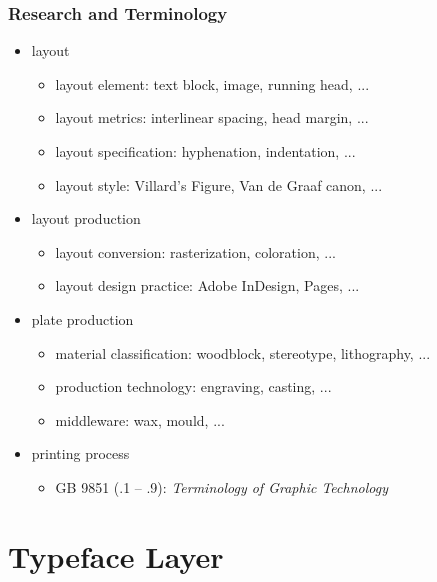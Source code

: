 \documentclass{beamer}
\begin{document}
	\begin{frame}
		\frametitle{Research and Terminology}

		\begin{itemize}
			\item layout
			\begin{itemize}
                \item layout element: text block, image, running head, ...
				\item layout metrics: interlinear spacing, head margin, ...
				\item layout specification: hyphenation, indentation, ...
				\item layout style: Villard's Figure, Van de Graaf canon, ...
            \end{itemize}
			\item layout production
			\begin{itemize}
				\item layout conversion: rasterization, coloration, ...
				\item layout design practice: Adobe InDesign, Pages, ...
			\end{itemize}
            \item plate production
			\begin{itemize}
                \item material classification: woodblock, stereotype, lithography, ...
                \item production technology: engraving, casting, ...
                \item middleware: wax, mould, ...
            \end{itemize}
            \item printing process
			\begin{itemize}
                \item GB 9851 (.1 -- .9): \textit{Terminology of Graphic Technology}
            \end{itemize}
		\end{itemize}
	\end{frame}

    \section{Typeface Layer}
\end{document}
